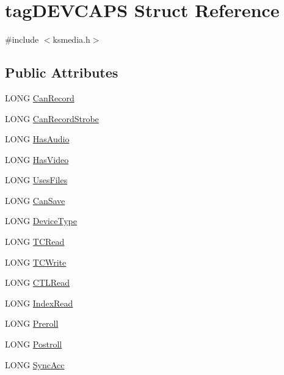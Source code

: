 \hypertarget{structtag_d_e_v_c_a_p_s}{}\section{tag\+D\+E\+V\+C\+A\+PS Struct Reference}
\label{structtag_d_e_v_c_a_p_s}


{\ttfamily \#include $<$ksmedia.\+h$>$}

\subsection*{Public Attributes}
\begin{DoxyCompactItemize}
\item 
L\+O\+NG \hyperlink{structtag_d_e_v_c_a_p_s_a5b7a594bc9a2e8f19275b7c82e9f941c}{Can\+Record}
\item 
L\+O\+NG \hyperlink{structtag_d_e_v_c_a_p_s_ac972c6daa5ae199e11bcecca27f79ea2}{Can\+Record\+Strobe}
\item 
L\+O\+NG \hyperlink{structtag_d_e_v_c_a_p_s_ab30bc5bc2636659f82048cb169f365a7}{Has\+Audio}
\item 
L\+O\+NG \hyperlink{structtag_d_e_v_c_a_p_s_ab8090f42c74b210fbf55f522dba7e48e}{Has\+Video}
\item 
L\+O\+NG \hyperlink{structtag_d_e_v_c_a_p_s_a59837eb7413094bee4770e5edea8f529}{Uses\+Files}
\item 
L\+O\+NG \hyperlink{structtag_d_e_v_c_a_p_s_a22781df9f7b897007d3a7b596118fc7a}{Can\+Save}
\item 
L\+O\+NG \hyperlink{structtag_d_e_v_c_a_p_s_a9c4e6122f960b8863ef63679af062dbf}{Device\+Type}
\item 
L\+O\+NG \hyperlink{structtag_d_e_v_c_a_p_s_a274d46458425c5b2979e37149c81490f}{T\+C\+Read}
\item 
L\+O\+NG \hyperlink{structtag_d_e_v_c_a_p_s_a2a43c901ada8408965b3af9b4b1adf14}{T\+C\+Write}
\item 
L\+O\+NG \hyperlink{structtag_d_e_v_c_a_p_s_ae7c766b2341e4367cafe9a6a2a4a4d7e}{C\+T\+L\+Read}
\item 
L\+O\+NG \hyperlink{structtag_d_e_v_c_a_p_s_a9509fe673cf1f9919d9e302d44d48be0}{Index\+Read}
\item 
L\+O\+NG \hyperlink{structtag_d_e_v_c_a_p_s_a3eff546d90ac0607bf75daf2eade6ead}{Preroll}
\item 
L\+O\+NG \hyperlink{structtag_d_e_v_c_a_p_s_a30ef6aff2fb5b84a385114da9b687dbb}{Postroll}
\item 
L\+O\+NG \hyperlink{structtag_d_e_v_c_a_p_s_ad7c11b3e75997845b0e2fec8e9f74871}{Sync\+Acc}

\end{DoxyCompactItemize}
